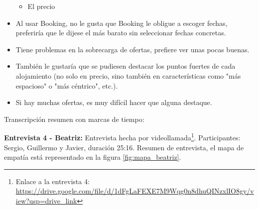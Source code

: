 \begin{itemize}
\begin{itemize}
        \item El precio
    \end{itemize}
    \item Al usar Booking, no le gusta que Booking le obligue a escoger fechas, preferiría que le dijese el más barato sin seleccionar fechas concretas.
    \item Tiene problemas en la sobrecarga de ofertas, prefiere ver unas pocas buenas.
    \item También le gustaría que se pudiesen destacar los puntos fuertes de cada alojamiento (no solo en precio, sino también en características como "más espacioso" o "más céntrico", etc.).
    \item Si hay muchas ofertas, es muy difícil hacer que alguna destaque.
\end{itemize}


Transcripción resumen con marcas de tiempo:

\textbf{Entrevista 4 - Beatriz:} Entrevista hecha por videollamada\footnote{Enlace a la entrevista 4: \url{https://drive.google.com/file/d/1dFgLaFEXE7M9Wqg0n8dhuQINzxlIO8gy/view?usp=drive_link}}. Participantes: Sergio, Guillermo y Javier, duración 25:16.
Resumen de entrevista, el mapa de empatía está representado en la figura \ref{fig:mapa_beatriz}.



